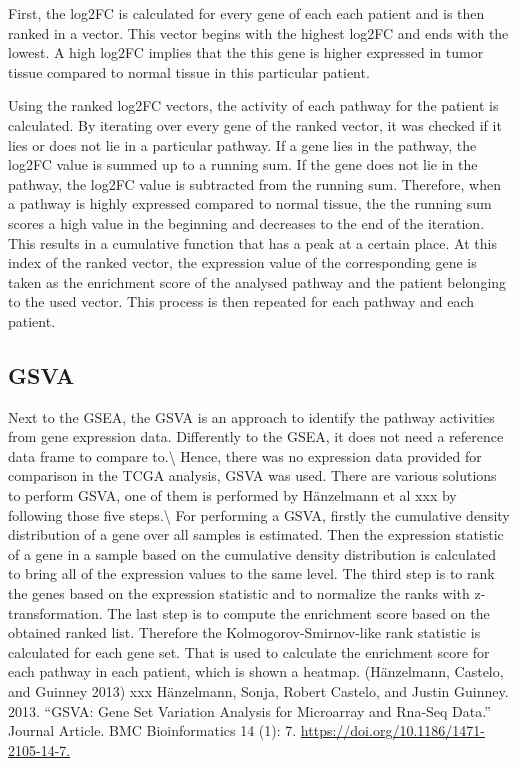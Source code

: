 \documentclass[
  parskip,
  oneside]{scrreprt}
\begin{document}
First, the log2FC is calculated for every gene of each each patient and
is then ranked in a vector. This vector begins with the highest log2FC
and ends with the lowest. A high log2FC implies that the this gene is
higher expressed in tumor tissue compared to normal tissue in this
particular patient.

Using the ranked log2FC vectors, the activity of each pathway for the
patient is calculated. By iterating over every gene of the ranked
vector, it was checked if it lies or does not lie in a particular
pathway. If a gene lies in the pathway, the log2FC value is summed up to
a running sum. If the gene does not lie in the pathway, the log2FC value
is subtracted from the running sum. Therefore, when a pathway is highly
expressed compared to normal tissue, the the running sum scores a high
value in the beginning and decreases to the end of the iteration. This
results in a cumulative function that has a peak at a certain place. At
this index of the ranked vector, the expression value of the
corresponding gene is taken as the enrichment score of the analysed
pathway and the patient belonging to the used vector. This process is
then repeated for each pathway and each patient.

\hypertarget{gsva}{%
\subsection{GSVA}\label{gsva}}

Next to the GSEA, the GSVA is an approach to identify the pathway
activities from gene expression data. Differently to the GSEA, it does
not need a reference data frame to compare to.\textbackslash{} Hence,
there was no expression data provided for comparison in the TCGA
analysis, GSVA was used. There are various solutions to perform GSVA,
one of them is performed by Hänzelmann et al xxx by following those five
steps.\textbackslash{} For performing a GSVA, firstly the cumulative
density distribution of a gene over all samples is estimated. Then the
expression statistic of a gene in a sample based on the cumulative
density distribution is calculated to bring all of the expression values
to the same level. The third step is to rank the genes based on the
expression statistic and to normalize the ranks with z-transformation.
The last step is to compute the enrichment score based on the obtained
ranked list. Therefore the Kolmogorov-Smirnov-like rank statistic is
calculated for each gene set. That is used to calculate the enrichment
score for each pathway in each patient, which is shown a heatmap.
(Hänzelmann, Castelo, and Guinney 2013) xxx Hänzelmann, Sonja, Robert
Castelo, and Justin Guinney. 2013. ``GSVA: Gene Set Variation Analysis
for Microarray and Rna-Seq Data.'' Journal Article. BMC Bioinformatics
14 (1): 7. \url{https://doi.org/10.1186/1471-2105-14-7.}
\end{document}
